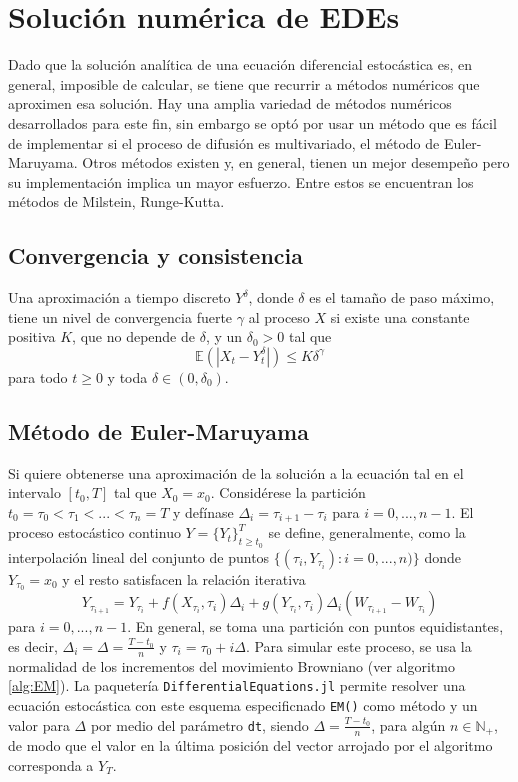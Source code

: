 \section{Solución numérica de EDEs}\label{sec:metodos_numericos}
\textcite{rackauckasDifferentialEquationsjlPerformantFeatureRich2017a}
Dado que la solución analítica de una ecuación diferencial estocástica 
es, en general, imposible de calcular, se tiene que recurrir a 
métodos  numéricos que aproximen esa solución. Hay una amplia 
variedad de métodos numéricos desarrollados para este fin, sin 
embargo se optó por usar un método que es fácil de implementar
si el proceso de difusión es multivariado, el método de Euler-Maruyama.
Otros métodos existen y, en general, tienen un mejor desempeño 
pero su implementación implica un mayor esfuerzo. Entre estos 
se encuentran los métodos de Milstein, Runge-Kutta.

\subsection{Convergencia y consistencia}

\begin{definition}
    Una aproximación a tiempo discreto $Y^\delta$, donde $\delta$ es el 
    tamaño de paso máximo, tiene un nivel de convergencia fuerte $\gamma$
    al proceso $X$ si existe una constante positiva $K$, que no depende de 
    $\delta$, y un $\delta_0>0$ tal que 
    $$\mathbb E\left(|X_t - Y_t^\delta|\right)\leq K\delta^\gamma$$
    para todo $t\geq 0$ y toda $\delta \in (0,\delta_0)$.
\end{definition}

\subsection{Método de Euler-Maruyama}
Si quiere obtenerse 
una aproximación de la solución a la ecuación tal 
en el intervalo $[t_0,T]$ tal que $X_0 = x_0$. Considérese la partición 
$t_0=\tau_0<\tau_1<...<\tau_n=T$ y defínase $\Delta_i=\tau_{i+1}-\tau_i$
para $i=0,...,n-1$. El proceso estocástico continuo $Y=\{Y_t\}_{t\geq t_0}^T$ 
se define, generalmente, como la interpolación lineal del conjunto de puntos 
$\{(\tau_i, Y_{\tau_i}):i=0,...,n)\}$ donde 
$Y_{\tau_0}=x_0$ y el resto satisfacen la relación iterativa
\begin{equation}\label{eq:EM}
Y_{\tau_{i+1}}=Y_{\tau_{i}}+f(X_{\tau_i},\tau_i)\Delta_i 
+ g(Y_{\tau_i},\tau_i)\Delta_i(W_{\tau_{i+1}}-W_{\tau_i})   
\end{equation}
para  $i=0,...,n-1$. En general, se toma una partición con puntos
equidistantes, es decir, $\Delta_i = \Delta = \frac{T-t_0}{n}$ y $\tau_i = \tau_0+i\Delta$. 
Para  simular este proceso, se usa la normalidad de los incrementos 
del movimiento Browniano (ver algoritmo \ref{alg:EM}). La paquetería 
\texttt{DifferentialEquations.jl} permite resolver una ecuación estocástica
con este esquema especificnado \texttt{EM()} como método y
un valor para $\Delta$ por medio del parámetro \texttt{dt}, siendo 
$\Delta=\frac{T-t_0}{n}$, para algún $n\in \mathbb N_+$, de modo que 
el valor en la última posición del vector arrojado por el algoritmo 
corresponda a $Y_{T}$.

